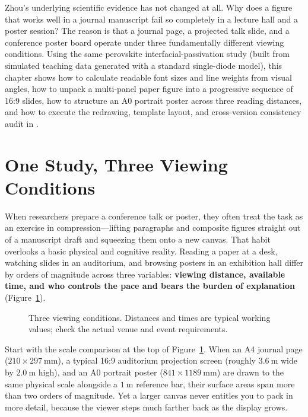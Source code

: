 Zhou's underlying scientific evidence has not changed at all. Why does a figure that works well in a journal manuscript fail so completely in a lecture hall and a poster session? The reason is that a journal page, a projected talk slide, and a conference poster board operate under three fundamentally different viewing conditions. Using the same perovskite interfacial-passivation study (built from simulated teaching data generated with a standard single-diode model), this chapter shows how to calculate readable font sizes and line weights from visual angles, how to unpack a multi-panel paper figure into a progressive sequence of 16:9 slides, how to structure an A0 portrait poster across three reading distances, and how to execute the redrawing, template layout, and cross-version consistency audit in \scidraw{}.

\section{One Study, Three Viewing Conditions}

When researchers prepare a conference talk or poster, they often treat the task as an exercise in compression---lifting paragraphs and composite figures straight out of a manuscript draft and squeezing them onto a new canvas. That habit overlooks a basic physical and cognitive reality. Reading a paper at a desk, watching slides in an auditorium, and browsing posters in an exhibition hall differ by orders of magnitude across three variables: \textbf{viewing distance, available time, and who controls the pace and bears the burden of explanation} (Figure~\ref{fig:ch12-01}).

\begin{figure}[htbp]\centering
\resizebox{\linewidth}{!}{}
\caption{Three viewing conditions. Distances and times are typical working values; check the actual venue and event requirements.}\label{fig:ch12-01}
\end{figure}

Start with the scale comparison at the top of Figure~\ref{fig:ch12-01}. When an A4 journal page ($210 \times 297\ \text{mm}$), a typical 16:9 auditorium projection screen (roughly $3.6\ \text{m}$ wide by $2.0\ \text{m}$ high), and an A0 portrait poster ($841 \times 1189\ \text{mm}$) are drawn to the same physical scale alongside a $1\ \text{m}$ reference bar, their surface areas span more than two orders of magnitude. Yet a larger canvas never entitles you to pack in more detail, because the viewer steps much farther back as the display grows.

